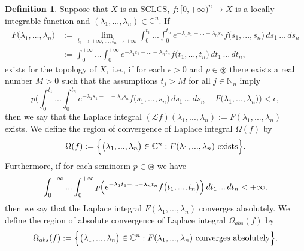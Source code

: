 \documentclass{amsart}
\theoremstyle{definition}
\newtheorem{defn}[thm]{Definition}
\theoremstyle{remark}
\numberwithin{equation}{section}
\begin{document}
\begin{defn}\label{svi}
Suppose that $X$ is an SCLCS, $f: [0,+\infty)^{n}\rightarrow X$ is a locally integrable function and $(\lambda_{1},...,\lambda_{n})\in {\mathbb C}^{n}$. If 
\begin{align*} 
F\bigl(\lambda_{1},...,\lambda_{n}\bigr)&:=\lim_{t_{1}\rightarrow +\infty;...;t_{n}\rightarrow +\infty}\int^{t_{1}}_{0}...\int^{t_{n}}_{0}e^{-\lambda_{1}s_{1}-...-\lambda_{n}s_{n}}f\bigl(s_{1},...,s_{n}\bigr)\, ds_{1}\, ...\, ds_{n}
\\& :=\int^{+\infty}_{0}...\int^{+\infty}_{0}e^{-\lambda_{1}t_{1}-...-\lambda_{n}t_{n}}f\bigl(t_{1},...,t_{n}\bigr)\, dt_{1}\, ...\, dt_{n},
\end{align*}
exists for the topology of $X,$ i.e., if for each $\epsilon>0$ and $p\in \circledast$ there exists a real number $M>0$ such that the assumptions $t_{j}>M$ for all $j\in {\mathbb N}_{n}$ imply 
$$
p\Biggl(\int^{t_{1}}_{0}...\int^{t_{n}}_{0}e^{-\lambda_{1}s_{1}-...-\lambda_{n}s_{n}}f\bigl(s_{1},...,s_{n}\bigr)\, ds_{1}\, ...\, ds_{n}- F\bigl(\lambda_{1},...,\lambda_{n}\bigr)\Biggr) <\epsilon ,
$$
then we say that the Laplace integral $({\mathcal Lf})(\lambda_{1},...,\lambda_{n}):=F(\lambda_{1},...,\lambda_{n})$ exists.
We define the region of convergence of Laplace integral $
\Omega(f)$ by
$$
\Omega(f):=\Bigl\{ \bigl(\lambda_{1},...,\lambda_{n}\bigr)\in {\mathbb C}^{n} : F(\lambda_{1},...,\lambda_{n})\mbox{ exists}\Bigr\}.
$$
Furthermore, if
for each seminorm $p\in \circledast$ we have
\begin{align*}
\int^{+\infty}_{0}...\int^{+\infty}_{0}p\Bigl(e^{-\lambda_{1}t_{1}-...-\lambda_{n}t_{n}}f\bigl(t_{1},...,t_{n}\bigr)\Bigr)\, dt_{1}\, ...\, dt_{n}<+\infty,
\end{align*}
then we say that the Laplace integral $F(\lambda_{1},...,\lambda_{n})$
converges absolutely. We define the region of absolute convergence of Laplace integral $
\Omega_{abs}(f)$ by
$$
\Omega_{abs}(f):=\Bigl\{ \bigl(\lambda_{1},...,\lambda_{n}\bigr)\in {\mathbb C}^{n} : F(\lambda_{1},...,\lambda_{n})\mbox{ converges absolutely}\Bigr\}.
$$
\end{defn}
\end{document}
